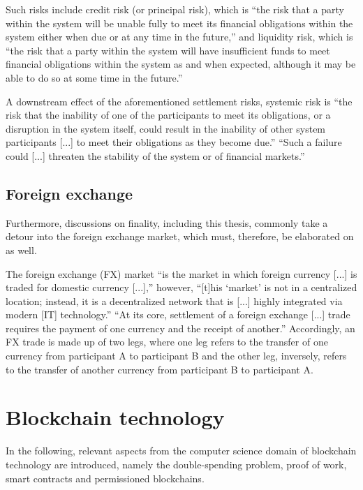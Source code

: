 Such risks include credit risk (or principal risk), which is ``the risk that a party within the system will be unable fully to meet its financial obligations within the system either when due or at any time in the future,'' and liquidity risk, which is ``the risk that a party within the system will have insufficient funds to meet financial obligations within the system as and when expected, although it may be able to do so at some time in the future.'' \autocite[5]{cpmi2001}

A downstream effect of the aforementioned settlement risks, systemic risk is ``the risk that the inability of one of the participants to meet its obligations, or a disruption in the system itself, could result in the inability of other system participants [...] to meet their obligations as they become due.'' \autocite[5]{cpmi2001}
``Such a failure could [...] threaten the stability of the system or of financial markets.'' \autocite[5]{cpmi2001}

\subsection{Foreign exchange}

Furthermore, discussions on finality, including this thesis, commonly take a detour into the foreign exchange market, which must, therefore, be elaborated on as well.

The foreign exchange (FX) market ``is the market in which foreign currency [...] is traded for domestic currency [...],'' however, ``[t]his `market' is not in a centralized location; instead, it is a decentralized network that is [...] highly integrated via modern [IT] technology.'' \autocite{frankel2020}
``At its core, settlement of a foreign exchange [...] trade requires the payment of one currency and the receipt of another.'' \autocite[4]{cpmi1996}
Accordingly, an FX trade is made up of two legs, where one leg refers to the transfer of one currency from participant A to participant B and the other leg, inversely, refers to the transfer of another currency from participant B to participant A.

\section{Blockchain technology}

In the following, relevant aspects from the computer science domain of blockchain technology are introduced, namely the double-spending problem, proof of work, smart contracts and permissioned blockchains.


